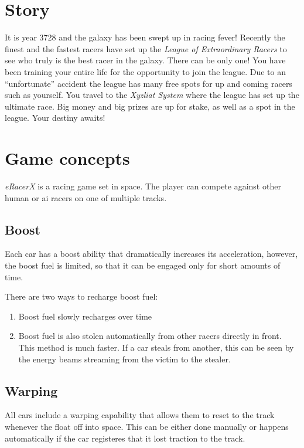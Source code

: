 \documentclass[11pt]{article}
\begin{document}
\section{Story}
\label{story}
It is year 3728 and the galaxy has been swept up in racing fever! Recently the
finest and the fastest racers have set up the \emph{League of Extraordinary
Racers} to see who truly is the best racer in the galaxy. There can be only
one! You have been training your entire life for the opportunity to join the
league. Due to an ``unfortunate'' accident the league has many free spots for
up and coming racers such as yourself. You travel to the \emph{Xyzliat System}
where the league has set up the ultimate race. Big money and big prizes  are up
for stake, as well as a spot in the league. Your destiny awaits!

\section{Game concepts}
\label{game-concepts}

\emph{eRacerX} is a racing game set in space. The player can compete against
other human or ai racers on one of multiple tracks. 

\subsection{Boost}

Each car has a boost ability that dramatically increases its acceleration,
however, the boost fuel is limited, so that it can be engaged only for
short amounts of time.

There are two ways to recharge boost fuel:

\begin{enumerate}
  \item Boost fuel slowly recharges over time
  \item Boost fuel is also stolen automatically from other racers directly in
  front. This method is much faster. If a car steals from another, this can be
  seen by the energy beams streaming from the victim to the stealer.
\end{enumerate}

\subsection{Warping}

All cars include a warping capability that allows them to reset to the track
whenever the float off into space. This can be either done manually or happens
automatically if the car registeres that it lost traction to the track.
\end{document}
